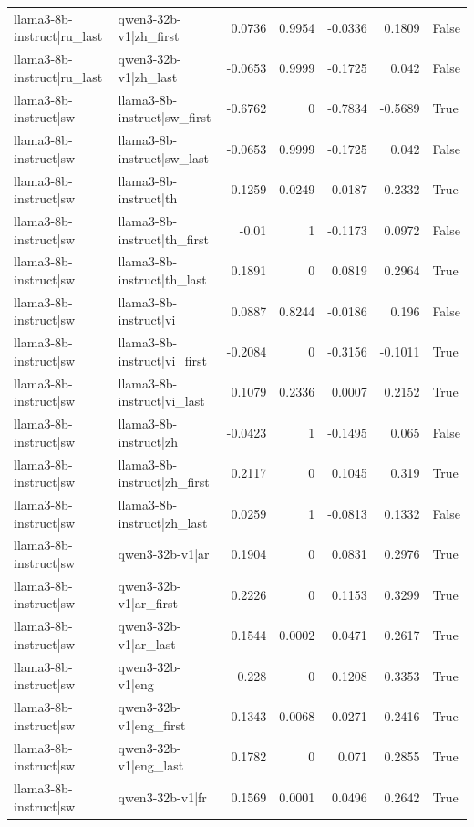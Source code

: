 \begin{table}
\begin{tabular}{l l r r r r l}
llama3-8b-instruct|ru_last & qwen3-32b-v1|zh_first & 0.0736 & 0.9954 & -0.0336 & 0.1809 & False \\
llama3-8b-instruct|ru_last & qwen3-32b-v1|zh_last & -0.0653 & 0.9999 & -0.1725 & 0.042 & False \\
llama3-8b-instruct|sw & llama3-8b-instruct|sw_first & -0.6762 & 0 & -0.7834 & -0.5689 & True \\
llama3-8b-instruct|sw & llama3-8b-instruct|sw_last & -0.0653 & 0.9999 & -0.1725 & 0.042 & False \\
llama3-8b-instruct|sw & llama3-8b-instruct|th & 0.1259 & 0.0249 & 0.0187 & 0.2332 & True \\
llama3-8b-instruct|sw & llama3-8b-instruct|th_first & -0.01 & 1 & -0.1173 & 0.0972 & False \\
llama3-8b-instruct|sw & llama3-8b-instruct|th_last & 0.1891 & 0 & 0.0819 & 0.2964 & True \\
llama3-8b-instruct|sw & llama3-8b-instruct|vi & 0.0887 & 0.8244 & -0.0186 & 0.196 & False \\
llama3-8b-instruct|sw & llama3-8b-instruct|vi_first & -0.2084 & 0 & -0.3156 & -0.1011 & True \\
llama3-8b-instruct|sw & llama3-8b-instruct|vi_last & 0.1079 & 0.2336 & 0.0007 & 0.2152 & True \\
llama3-8b-instruct|sw & llama3-8b-instruct|zh & -0.0423 & 1 & -0.1495 & 0.065 & False \\
llama3-8b-instruct|sw & llama3-8b-instruct|zh_first & 0.2117 & 0 & 0.1045 & 0.319 & True \\
llama3-8b-instruct|sw & llama3-8b-instruct|zh_last & 0.0259 & 1 & -0.0813 & 0.1332 & False \\
llama3-8b-instruct|sw & qwen3-32b-v1|ar & 0.1904 & 0 & 0.0831 & 0.2976 & True \\
llama3-8b-instruct|sw & qwen3-32b-v1|ar_first & 0.2226 & 0 & 0.1153 & 0.3299 & True \\
llama3-8b-instruct|sw & qwen3-32b-v1|ar_last & 0.1544 & 0.0002 & 0.0471 & 0.2617 & True \\
llama3-8b-instruct|sw & qwen3-32b-v1|eng & 0.228 & 0 & 0.1208 & 0.3353 & True \\
llama3-8b-instruct|sw & qwen3-32b-v1|eng_first & 0.1343 & 0.0068 & 0.0271 & 0.2416 & True \\
llama3-8b-instruct|sw & qwen3-32b-v1|eng_last & 0.1782 & 0 & 0.071 & 0.2855 & True \\
llama3-8b-instruct|sw & qwen3-32b-v1|fr & 0.1569 & 0.0001 & 0.0496 & 0.2642 & True \\

\end{tabular}
\end{table}
